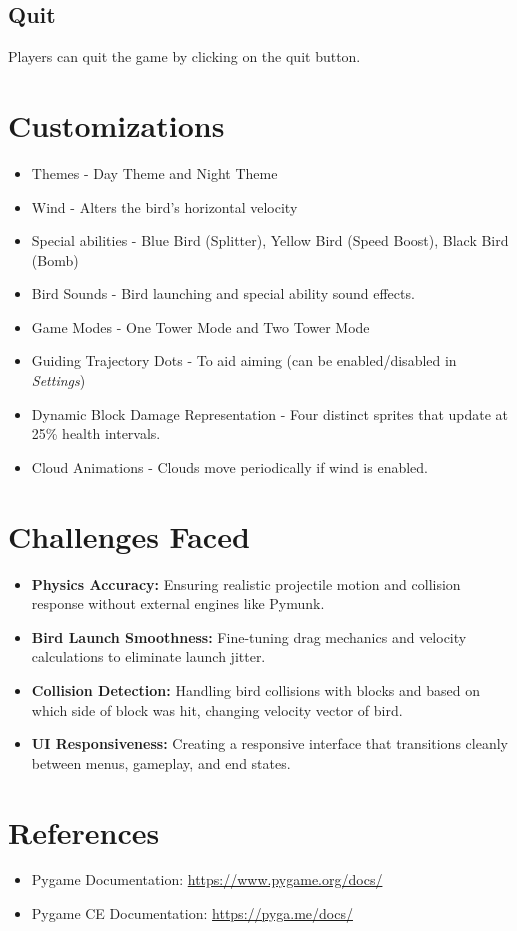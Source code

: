 \documentclass[10pt]{article}
\begin{document}
\subsection{Quit}
Players can quit the game by clicking on the quit button.

\section{Customizations}
\begin{itemize}
    \item Themes - Day Theme and Night Theme
    \item Wind - Alters the bird's horizontal velocity
    \item Special abilities - Blue Bird (Splitter), Yellow Bird (Speed Boost), Black Bird (Bomb)
    \item Bird Sounds - Bird launching and special ability sound effects.
    \item Game Modes - One Tower Mode and Two Tower Mode
    \item Guiding Trajectory Dots - To aid aiming (can be enabled/disabled in \textit{Settings})
    \item Dynamic Block Damage Representation - Four distinct sprites that update at 25\% health intervals.
    \item Cloud Animations - Clouds move periodically if wind is enabled.
\end{itemize}

\section{Challenges Faced}
\begin{itemize}
    \item \textbf{Physics Accuracy:} Ensuring realistic projectile motion and collision response without external engines like Pymunk.
    \item \textbf{Bird Launch Smoothness:} Fine-tuning drag mechanics and velocity calculations to eliminate launch jitter.
    \item \textbf{Collision Detection:} Handling bird collisions with blocks and based on which side of block was hit, changing velocity vector of bird.
    \item \textbf{UI Responsiveness:} Creating a responsive interface that transitions cleanly between menus, gameplay, and end states.
\end{itemize}

\section{References}
\begin{itemize}
    \item Pygame Documentation: \url{https://www.pygame.org/docs/}
    \item Pygame CE Documentation: \url{https://pyga.me/docs/}
\end{itemize}
\end{document}

